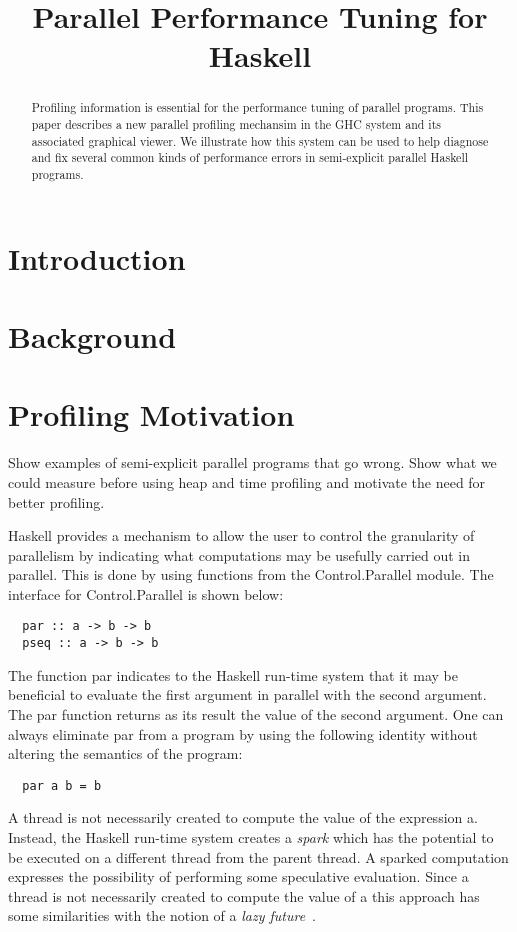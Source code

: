\documentclass[twocolumn,9pt]{sigplanconf}
\title{Parallel Performance Tuning for Haskell}
\newcommand{\codef}[1]{{\fontfamily{cmss}\small#1}}
\begin{document}
\maketitle

\begin{abstract}
Profiling information is essential for the performance tuning of parallel programs. This paper describes a new parallel profiling mechansim in the GHC system and its associated graphical viewer. We illustrate how this system can be used to help diagnose and fix several common kinds of performance errors in semi-explicit parallel Haskell programs.
\end{abstract}


\section{Introduction}

\section{Background}

\section{Profiling Motivation}
Show examples of semi-explicit parallel programs that go wrong. Show what we could measure before using heap and time profiling and motivate the need for better profiling.

Haskell provides a mechanism to allow the user to control the granularity of parallelism by indicating what computations may be usefully carried out in parallel. This is done by using functions from the \codef{Control.Parallel} module. The interface for \codef{Control.Parallel} is shown below:
\begin{lstlisting}
  par :: a -> b -> b 
  pseq :: a -> b -> b 
\end{lstlisting}
The function \codef{par} indicates to the Haskell run-time system that it may be beneficial to evaluate the first argument in parallel with the second argument. The \codef{par} function returns as its result the value of the second argument. One can always eliminate \codef{par} from a program by using the following identity without altering the semantics of the program:
\begin{lstlisting}
  par a b = b 
\end{lstlisting}
A thread is not necessarily created to compute the value of the expression \codef{a}. Instead, the Haskell run-time system creates a {\em spark} which has the potential to be executed on a different thread from the parent thread. A sparked computation expresses the possibility of performing some speculative evaluation. Since a thread is not necessarily created to compute the value of \codef{a} this approach has some similarities with the notion of a {\em lazy future}~\cite{mohr:91}.
\end{document}
